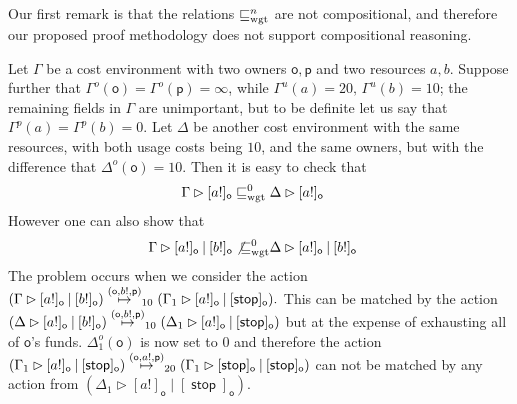 \documentclass{LMCS}
\newcommand{\pfn}[1]{\mathsf{#1}}  \newcommand{\cfn}[1]{\mathsf{#1}}  \newcommand{\ownfnt}[1]{{\mathsf{#1}}}
\newcommand{\with}{\mathbin \rhd}
\newcommand{\cancom}[3]{({\ownfnt{#1}},{#2},{\ownfnt{#3}}) \xspace}
\newcommand{\amort}[1]{\mathrel{\sqsubseteq_{\rm wgt}^{#1}}}
\newcommand{\Cstop}{\mathop{\pfn{stop}}}
\newcommand{\Cpar}{\mathbin{|}}
\newcommand{\Cloc}[2]{[#1]_{\ownfnt{#2}}}
\begin{document}
Our first remark is that the relations $\amort{n}$ are not compositional,
and therefore our proposed proof methodology does not support compositional reasoning. 

\begin{exa}\label{ex:noncomp}
  Let $\Gamma$ be a cost environment with two owners $\ownfnt o,\ownfnt
  p$ and two resources $a,b$.  Suppose further that $\Gamma^o({\ownfnt
    o}) = \Gamma^o({\ownfnt p}) = \infty$, while $\Gamma^u(a) =20,\, \Gamma^u(b) = 10$; the
  remaining fields in $\Gamma$ are unimportant, but to be definite let us
say that  $\Gamma^p(a) =  \Gamma^p(b) = 0$. Let $\Delta$ be
  another cost environment with the same resources, with both usage
  costs being $10$, and the same  owners, but  with the difference that
  $\Delta^o({\ownfnt o}) = 10$.  Then it is easy to check that
\begin{align*}
    \Gamma \with \Cloc{a!}{o}  &\amort{0}  \Delta \with \Cloc{a!}{o} 
\end{align*}
However one can also show that
\begin{align*}
         \Gamma \with \Cloc{a!}{o} \Cpar \Cloc{b!}{o}  &\not{\amort{0} } 
        \Delta \with \Cloc{a!}{o} \Cpar \Cloc{b!}{o} 
\end{align*}
The problem occurs when we consider the 
action
\begin{math}
   (\Gamma \with \Cloc{a!}{o} \Cpar \Cloc{b!}{o})
   \newar{\cancom{o}{b!}{p}}_{10} 
  (\Gamma_1 \with \Cloc{a!}{o} \Cpar \Cloc{\Cstop}{o}).
\end{math}
This can be matched by the action
\begin{math}
   (\Delta \with \Cloc{a!}{o} \Cpar \Cloc{b!}{o})
   \newar{\cancom{o}{b!}{p}}_{10}    
  (\Delta_1 \with \Cloc{a!}{o} \Cpar  \Cloc{\Cstop}{o})
\end{math}
but at the expense of exhausting all of ${\ownfnt o}$'s funds. $\Delta_1^o({\ownfnt o})$ is
now set to $0$ and therefore the action 
\begin{math}
   (\Gamma_1 \with \Cloc{a!}{o} \Cpar \Cloc{\Cstop}{o})
   \newar{\cancom{o}{a!}{p}}_{20} 
   (\Gamma_1 \with \Cloc{\Cstop}{o} \Cpar \Cloc{\Cstop}{o})
\end{math}
can not be matched by any action from
$  (\Delta_1 \with \Cloc{a!}{o} \Cpar  \Cloc{\Cstop}{o})$.


\end{exa}
\end{document}
